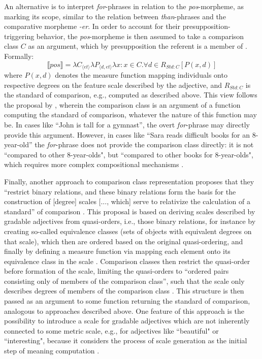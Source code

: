 An alternative is to interpret \textit{for}-phrases in relation to the \textit{pos}-morpheme, as marking its scope, similar to the relation between \textit{than}-phrases and the comparative morpheme \textit{-er}. In order to account for their presupposition-triggering behavior, the \textit{pos}-morpheme is then assumed to take a comparison class $C$ as an argument, which by presupposition the referent is a member of \parencite{Solt2009}. 
Formally:
\begin{equation}
\llbracket pos \rrbracket = \lambda C_{\langle et \rangle } \lambda P_{\langle d, et \rangle } \lambda x: x \in C.\forall d \in R_{Std:C}[P(x,d)]
\end{equation} 
where $P(x,d)$ denotes the measure function mapping individuals onto respective degrees on the feature scale described by the adjective, and $R_{Std:C}$ is the standard of comparison, e.g., computed as described above.
This view follows the proposal by \textcite{bartsch1972}, wherein the comparison class is an argument of a function computing the standard of comparison, whatever the nature of this function may be.  In cases like “John is tall for a gymnast”, the overt \textit{for}-phrase may directly provide this argument. However, in cases like “Sara reads difficult books for an 8-year-old” the \emph{for}-phrase does not provide the comparison class directly: it is not ``compared to other 8-year-olds", but ``compared to other books for 8-year-olds", which requires more complex compositional mechanisms \parencite[e.g., as suggested by][]{Solt2009}. %

Finally, another approach to comparison class representation proposes that they “restrict binary relations, and these binary relations form the basis for the construction of [degree] scales [..., which] serve to relativize the calculation of a standard” of comparison \parencite[p. 170]{Bale2011}. This proposal is based on deriving scales described by gradable adjectives from quasi-orders, i.e., those binary relations, for instance by creating so-called equivalence classes (sets of objects with equivalent degrees on that scale), which then are ordered based on the original quasi-ordering, and finally by defining a measure function via mapping each element onto its equivalence class in the scale \parencite{Bale2011}. Comparison classes then restrict the quasi-order before formation of the scale, limiting the quasi-orders to “ordered pairs consisting only of members of the comparison class”, such that the scale only describes degrees of members of the comparison class \parencite[p. 178]{Bale2011}. This structure is then passed as an argument to some function returning the standard of comparison, analogous to approaches described above. One feature of this approach is the possibility to introduce a scale for gradable adjectives which are not inherently connected to some metric scale, e.g., for adjectives like ``beautiful" or ``interesting", because it considers the process of scale generation as the initial step of meaning computation \parencite{Bale2011}.   

